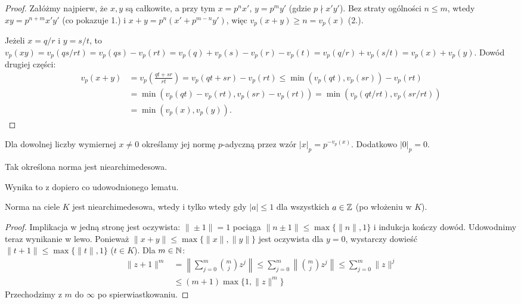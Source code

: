 \begin{proof}
	Załóżmy najpierw, że $x, y$ są całkowite, a przy tym $x = p^n x'$, $y = p^m y'$ (gdzie $p \nmid x'y'$).
	Bez straty ogólności $n \le m$, wtedy $xy = p^{n + m} x'y'$ (co pokazuje 1.) i $x + y = p^n(x' + p^{m-n}y')$, więc $v_p(x + y) \ge n = v_p(x)$ (2.).

	Jeżeli $x = q/r$ i $y = s/t$, to $v_p(xy) = v_p(qs/rt) = v_p(qs) - v_p(rt) = v_p(q) +v_p(s) - v_p(r) - v_p(t) = v_p(q/r) + v_p(s/t) = v_p(x)  + v_p(y)$.
	Dowód drugiej części:
	\begin{align*}
		v_p(x + y) & = v_p (\frac{qt + sr}{rt}) = v_p(qt + sr) - v_p(rt) \le \min(v_p(qt), v_p(sr)) - v_p(rt) \\
		& = \min(v_p(qt) - v_p(rt), v_p(sr) - v_p(rt)) = \min(v_p(qt/rt), v_p(sr / rt)) \\
		& = \min(v_p(x), v_p(y)).
	\end{align*}
\end{proof}

\begin{definicja}
	Dla dowolnej liczby wymiernej $x \neq 0$ określamy jej normę $p$-adyczną przez wzór $|x|_p = p^{-v_p(x)}$.
	Dodatkowo $|0|_p = 0$.
\end{definicja}

\begin{fakt}
	Tak określona norma jest niearchimedesowa.
\end{fakt}

Wynika to z dopiero co udowodnionego lematu.

\begin{fakt}
	Norma na ciele $K$ jest niearchimedesowa, wtedy i tylko wtedy gdy $|a| \le 1$ dla wszystkich $a \in \mathbb{Z}$ (po włożeniu w $K$).
\end{fakt}

\begin{proof}
	Implikacja w jedną stronę jest oczywista: $\|\pm 1\| = 1$ pociąga $\|n \pm 1\| \le \max \{\|n\|, 1\}$ i indukcja kończy dowód.
	Udowodnimy teraz wynikanie w lewo.
	Ponieważ $\|x + y\| \le \max \{\|x\|, \|y\|\}$ jest oczywista dla $y = 0$, wystarczy dowieść $\|t+1\| \le \max \{\|t\|, 1\}$ ($t \in K$).
	Dla $m \in \mathbb{N}$:
	\begin{align*}
		\|z+1\|^m & = \left\|\sum_{j=0}^m {m \choose j} z^j \right\| \le \sum_{j=0}^m \left\| {m \choose j} z^j \right\| \le \sum_{j=0}^m \|z\|^j \\
		& \le (m+1) \max \{1, \|z\|^m\}
	\end{align*}
	Przechodzimy z $m$ do $\infty$ po spierwiastkowaniu.
\end{proof}

